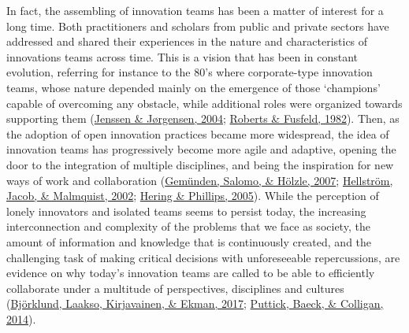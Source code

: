 \documentclass[]{elsarticle} %
\begin{document}
In fact, the assembling of innovation teams has been a matter of
interest for a long time. Both practitioners and scholars from public
and private sectors have addressed and shared their experiences in the
nature and characteristics of innovations teams across time. This is a
vision that has been in constant evolution, referring for instance to
the 80's where corporate-type innovation teams, whose nature depended
mainly on the emergence of those `champions' capable of overcoming any
obstacle, while additional roles were organized towards supporting them
(\protect\hyperlink{ref-Jenssen2004}{Jenssen \& Jørgensen, 2004};
\protect\hyperlink{ref-Roberts1982}{Roberts \& Fusfeld, 1982}). Then, as
the adoption of open innovation practices became more widespread, the
idea of innovation teams has progressively become more agile and
adaptive, opening the door to the integration of multiple disciplines,
and being the inspiration for new ways of work and collaboration
(\protect\hyperlink{ref-Gemunden2007}{Gemünden, Salomo, \& Hölzle,
2007}; \protect\hyperlink{ref-Hellstrom2002}{Hellström, Jacob, \&
Malmquist, 2002}; \protect\hyperlink{ref-Hering2005}{Hering \& Phillips,
2005}). While the perception of lonely innovators and isolated teams
seems to persist today, the increasing interconnection and complexity of
the problems that we face as society, the amount of information and
knowledge that is continuously created, and the challenging task of
making critical decisions with unforeseeable repercussions, are evidence
on why today's innovation teams are called to be able to efficiently
collaborate under a multitude of perspectives, disciplines and cultures
(\protect\hyperlink{ref-Bjorklund2017}{Björklund, Laakso, Kirjavainen,
\& Ekman, 2017}; \protect\hyperlink{ref-Puttick2014-Teams}{Puttick,
Baeck, \& Colligan, 2014}).
\end{document}
